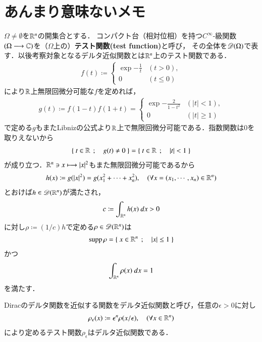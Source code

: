 \section{あんまり意味ないメモ}
	$\Omega \neq \emptyset$を$\mathbb{R}^n$の開集合とする．
	コンパクト台（相対位相）を持つ$C^\infty$-級関数$(\Omega \longrightarrow \mathbb{C})$を（$\Omega$上の）{\bf テスト関数(test function)}と呼び，
	その全体を$\mathscr{D}(\Omega)$で表す．以後考察対象となるデルタ近似関数とは$\mathbb{R}^n$上のテスト関数である．
	\begin{align}
		f(t) \coloneqq 
		\begin{cases}
			\exp{-\frac{1}{t}} & (t > 0), \\
			0 & (t \leq 0)
		\end{cases}
	\end{align}
	により$\mathbb{R}$上無限回微分可能な$f$を定めれば，
	\begin{align}
		g(t) \coloneqq f(1-t)f(1+t) = 
		\begin{cases}
			\exp{-\frac{2}{1-t^2}} & (|t| < 1), \\
			0 & (|t| \geq 1)
		\end{cases}
	\end{align}
	で定める$g$もまたLibnizの公式より$\mathbb{R}$上で無限回微分可能である．指数関数は0を取りえないから
	\begin{align}
		\left\{\ t \in \mathbb{R}\ \, ; \quad g(t) \neq 0\ \right\} = \left\{\ t \in \mathbb{R}\ \, ; \quad |t| < 1\ \right\}
	\end{align}
	が成り立つ．$\mathbb{R}^n \ni x \longmapsto |x|^2$もまた無限回微分可能であるから
	\begin{align}
		h(x) \coloneqq g(|x|^2) = g(x_1^2+ \cdots + x_n^2),
		\quad (\forall x=(x_1,\cdots,x_n) \in \mathbb{R}^n)
	\end{align}
	とおけば$h \in \mathscr{D}(\mathbb{R}^n)$が満たされ，
	\begin{align}
		c \coloneqq \int_{\mathbb{R}^n} h(x)\ dx > 0
	\end{align}
	に対し$\rho \coloneqq (1/c)h$で定める$\rho \in \mathscr{D}(\mathbb{R}^n)$は
	\begin{align}
		\operatorname{supp} \rho = \left\{\ x \in \mathbb{R}^n\ \, ; \quad |x| \leq 1\ \right\}
	\end{align}
	かつ
	\begin{align}
		\int_{\mathbb{R}^n} \rho(x)\ dx = 1
	\end{align}
	を満たす．
	
	\begin{screen}
		\begin{dfn}[デルタ近似関数]
			Diracのデルタ関数を近似する関数をデルタ近似関数と呼び，任意の$\epsilon > 0$に対し
			\begin{align}
				\rho_\epsilon(x) \coloneqq \epsilon^n \rho(x/\epsilon),
				\quad (\forall x \in \mathbb{R}^n)
			\end{align}
			により定めるテスト関数$\rho_\epsilon$はデルタ近似関数である．
		\end{dfn}
	\end{screen}
	
